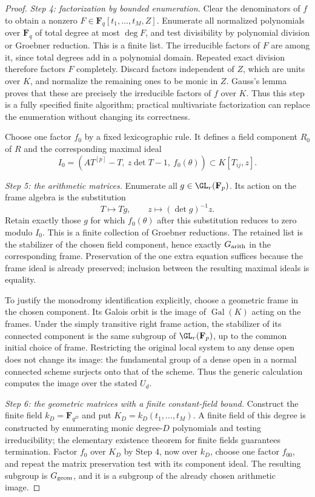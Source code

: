 \begin{proof}
\emph{Step 4: factorization by bounded enumeration.}
Clear the denominators of $f$ to obtain a nonzero
$F\in\mathbf F_q[t_1,\ldots,t_M,Z]$.
Enumerate all normalized polynomials over $\mathbf F_q$
of total degree at most $\deg F$, and test divisibility
by polynomial division or Groebner reduction.
This is a finite list.  The irreducible factors of
$F$ are among it, since total degrees add in a
polynomial domain.  Repeated exact division therefore
factors $F$ completely.  Discard factors independent
of $Z$, which are units over $K$, and normalize the
remaining ones to be monic in $Z$.
Gauss's lemma proves that these are precisely the
irreducible factors of $f$ over $K$.
Thus this step is a fully specified finite algorithm;
practical multivariate factorization can replace the
enumeration without changing its correctness.

Choose one factor $f_0$ by a fixed lexicographic rule.
It defines a field component $R_0$ of $R$ and the
corresponding maximal ideal
\[
 I_0=(A T^{[p]}-T,\ z\det T-1,\ f_0(\theta))
       \subset K[T_{ij},z].
\]

\emph{Step 5: the arithmetic matrices.}
Enumerate all $g\in\GL_r(\mathbf F_p)$.
Its action on the frame algebra is the substitution
\[
 T\longmapsto Tg,\qquad z\longmapsto(\det g)^{-1}z.
\]
Retain exactly those $g$ for which $f_0(\theta)$ after
this substitution reduces to zero modulo $I_0$.
This is a finite collection of Groebner reductions.
The retained list is the stabilizer of the chosen
field component, hence exactly $G_{\rm arith}$ in
the corresponding frame.  Preservation of the one
extra equation suffices because the frame ideal is
already preserved; inclusion between the resulting
maximal ideals is equality.

To justify the monodromy identification explicitly,
choose a geometric frame in the chosen component.
Its Galois orbit is the image of $\operatorname{Gal}(K)$
acting on the frames.  Under the simply transitive
right frame action, the stabilizer of its connected
component is the same subgroup of $\GL_r(\mathbf F_p)$,
up to the common initial choice of frame.
Restricting the original local system to any dense
open does not change its image: the fundamental group
of a dense open in a normal connected scheme surjects
onto that of the scheme.  Thus the generic calculation
computes the image over the stated $U_d$.

\emph{Step 6: the geometric matrices with a finite
constant-field bound.}
Construct the finite field $k_D=\mathbf F_{q^D}$ and
put $K_D=k_D(t_1,\ldots,t_M)$.
A finite field of this degree is constructed by
enumerating monic degree-$D$ polynomials and testing
irreducibility; the elementary existence theorem
for finite fields guarantees termination.
Factor $f_0$ over $K_D$ by Step 4, now over $k_D$,
choose one factor $f_{00}$, and repeat the matrix
preservation test with its component ideal.
The resulting subgroup is $G_{\rm geom}$, and it is
a subgroup of the already chosen arithmetic image.


\end{proof}
